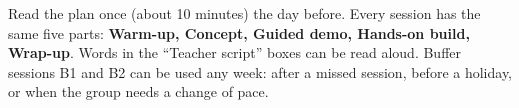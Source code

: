 \documentclass[level=1,teacher]{kidscode}
\begin{document}

\begin{tip}
Read the plan once (about 10 minutes) the day before. Every session has the same five parts:
\textbf{Warm-up, Concept, Guided demo, Hands-on build, Wrap-up}. Words in the
\enquote{Teacher script} boxes can be read aloud. Buffer sessions B1 and B2 can be used
any week: after a missed session, before a holiday, or when the group needs a change of pace.
\end{tip}
\kcweeklytoc
{}
\end{document}
